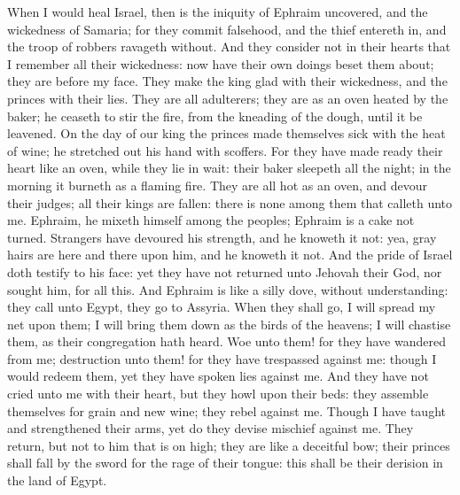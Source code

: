 When I would heal Israel, then is the iniquity of Ephraim uncovered, and the wickedness of Samaria; for they commit falsehood, and the thief entereth in, and the troop of robbers ravageth without. And they consider not in their hearts that I remember all their wickedness: now have their own doings beset them about; they are before my face. They make the king glad with their wickedness, and the princes with their lies. They are all adulterers; they are as an oven heated by the baker; he ceaseth to stir the fire, from the kneading of the dough, until it be leavened. On the day of our king the princes made themselves sick with the heat of wine; he stretched out his hand with scoffers. For they have made ready their heart like an oven, while they lie in wait: their baker sleepeth all the night; in the morning it burneth as a flaming fire. They are all hot as an oven, and devour their judges; all their kings are fallen: there is none among them that calleth unto me.  Ephraim, he mixeth himself among the peoples; Ephraim is a cake not turned. Strangers have devoured his strength, and he knoweth it not: yea, gray hairs are here and there upon him, and he knoweth it not. And the pride of Israel doth testify to his face: yet they have not returned unto Jehovah their God, nor sought him, for all this. And Ephraim is like a silly dove, without understanding: they call unto Egypt, they go to Assyria. When they shall go, I will spread my net upon them; I will bring them down as the birds of the heavens; I will chastise them, as their congregation hath heard. Woe unto them! for they have wandered from me; destruction unto them! for they have trespassed against me: though I would redeem them, yet they have spoken lies against me. And they have not cried unto me with their heart, but they howl upon their beds: they assemble themselves for grain and new wine; they rebel against me. Though I have taught and strengthened their arms, yet do they devise mischief against me. They return, but not to him that is on high; they are like a deceitful bow; their princes shall fall by the sword for the rage of their tongue: this shall be their derision in the land of Egypt. 

